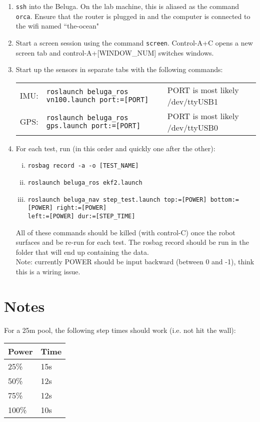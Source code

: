\documentclass{article}
\begin{document}
\begin{enumerate}
\item{ \texttt{ssh} into the Beluga. 
On the lab machine, this is aliased as the command \texttt{orca}.
Ensure that the router is plugged in and the computer is connected to the wifi named ``the-ocean"
}
\item{
Start a screen session using the command \texttt{screen}.
Control-A+C opens a new screen tab and control-A+[WINDOW\_NUM] switches windows.
}
\item{
Start up the sensors in separate tabs with the following commands: \vspace{-15pt}
\begin{center}
\begin{tabular}{lll}
IMU: & \texttt{roslaunch beluga\_ros vn100.launch port:=[PORT]} & PORT is most likely /dev/ttyUSB1 \\
GPS: & \texttt{roslaunch beluga\_ros gps.launch port:=[PORT]} & PORT is most likely /dev/ttyUSB0 \\
\end{tabular}
\end{center}
}
\item{
For each test, run (in this order and quickly one after the other):
\begin{enumerate}[i.]
\item \texttt{rosbag record -a -o [TEST\_NAME]}
\item \texttt{roslaunch beluga\_ros ekf2.launch}
\item \texttt{roslaunch beluga\_nav step\_test.launch top:=[POWER] bottom:=[POWER] right:=[POWER] \\ left:=[POWER] dur:=[STEP\_TIME]}
\end{enumerate}
All of these commands should be killed (with control-C) once the robot surfaces and be re-run for each test.
The rosbag record should be run in the folder that will end up containing the data. \\
Note: currently POWER should be input backward (between 0 and -1), think this is a wiring issue.
}
\end{enumerate}

\section*{Notes}
For a 25m pool, the following step times should work (i.e. not hit the wall):
\begin{center}
\begin{tabular}{ll}
Power & Time \\ \hline
25\% & 15s \\
50\% & 12s \\
75\% & 12s \\
100\% & 10s \\
\end{tabular}
\end{center}
\end{document}
